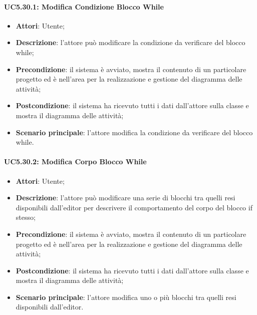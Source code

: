 \paragraph{UC5.30.1: Modifica Condizione Blocco While}
\label{UC5.30.1}
\begin{itemize}
	\item \textbf{Attori}: Utente;
	\item \textbf{Descrizione}: l'attore può modificare la condizione da verificare del blocco while;
	\item \textbf{Precondizione}: il sistema è avviato, mostra il contenuto di un particolare progetto ed è nell'area per la realizzazione e gestione del diagramma delle attività;
	\item \textbf{Postcondizione}: il sistema ha ricevuto tutti i dati dall'attore sulla classe e mostra il diagramma delle attività;
	\item \textbf{Scenario principale}: l'attore modifica la condizione da verificare del blocco while.
\end{itemize}

\paragraph{UC5.30.2: Modifica Corpo Blocco While}
\label{UC5.30.2}
\begin{itemize}
	\item \textbf{Attori}: Utente;
	\item \textbf{Descrizione}: l'attore può modificare una serie di blocchi tra quelli resi disponibili dall'editor per descrivere il comportamento del corpo del blocco if stesso;
	\item \textbf{Precondizione}: il sistema è avviato, mostra il contenuto di un particolare progetto ed è nell'area per la realizzazione e gestione del diagramma delle attività;
	\item \textbf{Postcondizione}: il sistema ha ricevuto tutti i dati dall'attore sulla classe e mostra il diagramma delle attività;
	\item \textbf{Scenario principale}: l'attore modifica uno o più blocchi tra quelli resi disponibili dall'editor.
\end{itemize}

